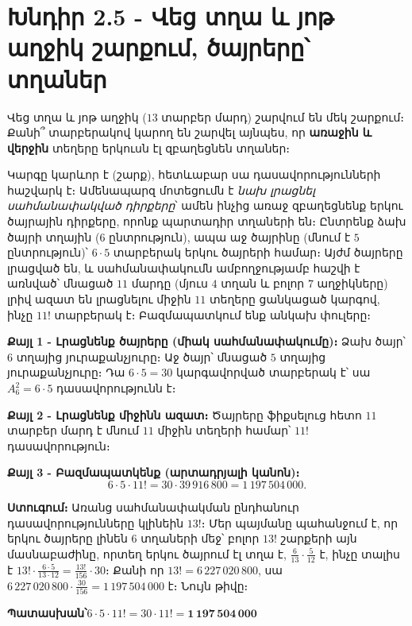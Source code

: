 \documentclass[11pt,a4paper]{article}
\newcommand{\answer}[1]{\begin{answerbox}\centering\textbf{Պատասխան՝}\quad #1\end{answerbox}}
\begin{document}
\section*{Խնդիր 2.5 - Վեց տղա և յոթ աղջիկ շարքում, ծայրերը՝ տղաներ}

\begin{problembox}[2.5]
Վեց տղա և յոթ աղջիկ ($13$ տարբեր մարդ) շարվում են մեկ շարքում։ Քանի՞ տարբերակով կարող են
շարվել այնպես, որ \textbf{առաջին և վերջին} տեղերը երկուսն էլ զբաղեցնեն տղաներ։
\end{problembox}

\begin{ideabox}
Կարգը կարևոր է (շարք), հետևաբար սա դասավորությունների հաշվարկ է։ Ամենապարզ մոտեցումն է \emph{նախ
լրացնել սահմանափակված դիրքերը}՝ ամեն ինչից առաջ զբաղեցնենք երկու ծայրային դիրքերը, որոնք պարտադիր
տղաների են։ Ընտրենք ձախ ծայրի տղային ($6$ ընտրություն), ապա աջ ծայրինը (մնում է $5$ ընտրություն)՝
$6\cdot 5$ տարբերակ երկու ծայրերի համար։ Այժմ ծայրերը լրացված են, և սահմանափակումն ամբողջությամբ
հաշվի է առնված՝ մնացած $11$ մարդը (մյուս $4$ տղան և բոլոր $7$ աղջիկները) լրիվ ազատ են լրացնելու
միջին $11$ տեղերը ցանկացած կարգով, ինչը $11!$ տարբերակ է։ Բազմապատկում ենք անկախ փուլերը։
\end{ideabox}

\textbf{Քայլ 1 - Լրացնենք ծայրերը (միակ սահմանափակումը)։}
Ձախ ծայր՝ $6$ տղայից յուրաքանչյուրը։ Աջ ծայր՝ մնացած $5$ տղայից յուրաքանչյուրը։ Դա $6\cdot 5 = 30$
կարգավորված տարբերակ է՝ սա $A_6^2 = 6\cdot 5$ դասավորությունն է։

\textbf{Քայլ 2 - Լրացնենք միջինն ազատ։}
Ծայրերը ֆիքսելուց հետո $11$ տարբեր մարդ է մնում $11$ միջին տեղերի համար՝ $11!$ դասավորություն։

\textbf{Քայլ 3 - Բազմապատկենք (արտադրյալի կանոն)։}
\[
6\cdot 5\cdot 11! = 30\cdot 39\,916\,800 = 1\,197\,504\,000 .
\]

\textbf{Ստուգում։} Առանց սահմանափակման ընդհանուր դասավորությունները կլինեին $13!$։ Մեր պայմանը
պահանջում է, որ երկու ծայրերը լինեն $6$ տղաների մեջ՝ բոլոր $13!$ շարքերի այն մասնաբաժինը, որտեղ
երկու ծայրում էլ տղա է, $\tfrac{6}{13}\cdot\tfrac{5}{12}$ է, ինչը տալիս է $13!\cdot\tfrac{6\cdot5}{13\cdot12} = \tfrac{13!}{156}\cdot30$։
Քանի որ $13! = 6\,227\,020\,800$, սա $6\,227\,020\,800\cdot\tfrac{30}{156}=1\,197\,504\,000$ է։ Նույն թիվը։ \checkmark

\answer{$6\cdot 5\cdot 11! = 30\cdot 11! = \mathbf{1\,197\,504\,000}$}
\end{document}
